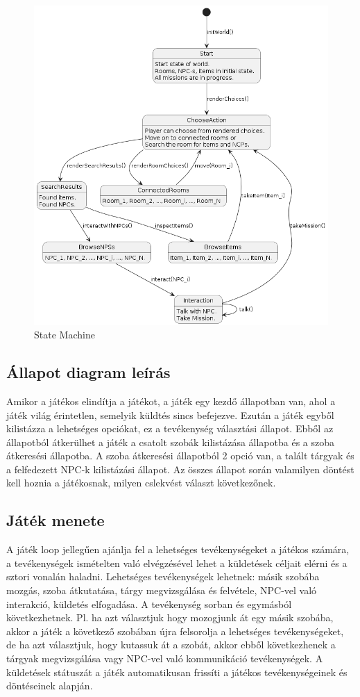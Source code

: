 \documentclass{scrarticle}
\begin{document}
\begin{figure}[H]
    \includegraphics[width=1.0\columnwidth]{State_Machine.png}
    \caption{State Machine}\label{fig:6}
\end{figure}
\newpage
\subsection{Állapot diagram leírás}
Amikor a játékos elindítja a játékot, a játék egy kezdő állapotban van, ahol a játék világ érintetlen, semelyik küldtés sincs befejezve. Ezután a játék egyből kilistázza a lehetséges opciókat, ez a tevékenység választási állapot. Ebből az állapotból átkerülhet a játék a csatolt szobák kilistázása állapotba és a szoba átkeresési állapotba. A szoba átkeresési állapotból 2 opció van, a talált tárgyak és a felfedezett NPC-k kilistázási állapot. Az összes állapot során valamilyen döntést kell hoznia a játékosnak, milyen cslekvést választ következőnek.

\subsection{Játék menete}
A játék loop jellegűen ajánlja fel a lehetséges tevékenységeket a játékos számára, a tevékenységek ismételten való elvégzésével lehet a küldetések céljait elérni és a sztori vonalán haladni. Lehetséges tevékenységek lehetnek: másik szobába mozgás, szoba átkutatása, tárgy megvizsgálása és felvétele, NPC-vel való interakció, küldetés elfogadása. A tevékenység sorban és egymásból következhetnek. Pl. ha azt választjuk hogy mozogjunk át egy másik szobába, akkor a játék a következő szobában újra felsorolja a lehetséges tevékenységeket, de ha azt választjuk, hogy kutassuk át a szobát, akkor ebből következhenek a tárgyak megvizsgálása vagy NPC-vel való kommunikáció tevékenységek. A küldetések státuszát a játék automatikusan frissíti a játékos tevékenységeinek és döntéseinek alapján.
\end{document}
